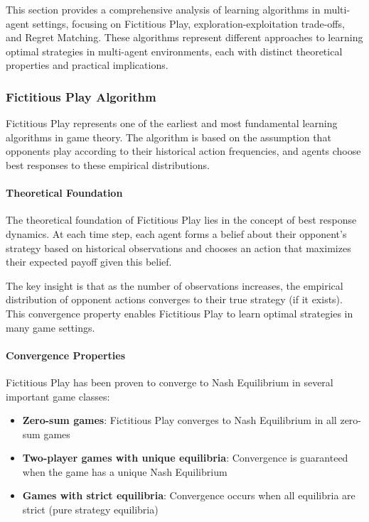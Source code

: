 \documentclass[conference]{IEEEtran}
\begin{document}
This section provides a comprehensive analysis of learning algorithms in multi-agent settings, focusing on Fictitious Play, exploration-exploitation trade-offs, and Regret Matching. These algorithms represent different approaches to learning optimal strategies in multi-agent environments, each with distinct theoretical properties and practical implications.

\subsubsection{Fictitious Play Algorithm}

Fictitious Play represents one of the earliest and most fundamental learning algorithms in game theory. The algorithm is based on the assumption that opponents play according to their historical action frequencies, and agents choose best responses to these empirical distributions.

\paragraph{Theoretical Foundation}

The theoretical foundation of Fictitious Play lies in the concept of best response dynamics. At each time step, each agent forms a belief about their opponent's strategy based on historical observations and chooses an action that maximizes their expected payoff given this belief.

The key insight is that as the number of observations increases, the empirical distribution of opponent actions converges to their true strategy (if it exists). This convergence property enables Fictitious Play to learn optimal strategies in many game settings.

\paragraph{Convergence Properties}

Fictitious Play has been proven to converge to Nash Equilibrium in several important game classes:

\begin{itemize}
    \item \textbf{Zero-sum games}: Fictitious Play converges to Nash Equilibrium in all zero-sum games
    \item \textbf{Two-player games with unique equilibria}: Convergence is guaranteed when the game has a unique Nash Equilibrium
    \item \textbf{Games with strict equilibria}: Convergence occurs when all equilibria are strict (pure strategy equilibria)
\end{itemize}
\end{document}
